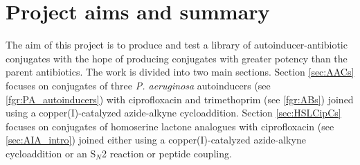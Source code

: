 \newpage

\section{Project aims and summary}

The aim of this project is to produce and test a library of autoinducer-antibiotic conjugates with the hope of producing conjugates with greater potency than the parent antibiotics.
The work is divided into two main sections. Section \ref{sec:AACs} focuses on conjugates of three \textit{P. aeruginosa} autoinducers (see \ref{fgr:PA_autoinducers}) with ciprofloxacin and trimethoprim (see \ref{fgr:ABs}) joined using a copper(I)-catalyzed azide-alkyne cycloaddition.
Section \ref{sec:HSLCipCs} focuses on conjugates of homoserine lactone analogues with ciprofloxacin (see \ref{sec:AIA_intro}) joined either using a copper(I)-catalyzed azide-alkyne cycloaddition or an S$_N$2 reaction or peptide coupling.








